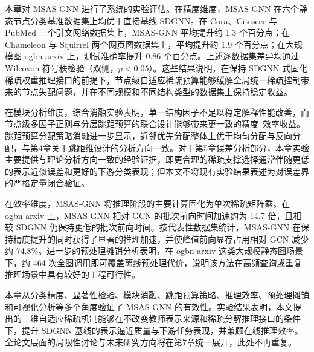 本章对 MSAS-GNN 进行了系统的实验评估。在精度维度，MSAS-GNN 在六个静态节点分类基准数据集上均优于直接基线 SDGNN。在 Cora、Citeseer 与 PubMed 三个引文网络数据集上，MSAS-GNN 平均提升约 1.3 个百分点；在 Chameleon 与 Squirrel 两个网页图数据集上，平均提升约 1.9 个百分点；在大规模图 ogbn-arxiv 上，测试准确率提升 0.86 个百分点。上述逐数据集差异均通过 Wilcoxon 符号秩检验（双侧，$p<0.05$）。这些结果说明，在保持 SDGNN 式固化稀疏权重推理接口的前提下，节点级自适应稀疏预算能够缓解全局统一稀疏控制带来的节点失配问题，并在不同规模和不同结构类型的数据集上保持稳定收益。

在模块分析维度，综合消融实验表明，单一结构因子不足以稳定解释性能改善，而节点级多因子正则与分层跳距预算的联合设计能够带来更一致的精度--效率收益。跳距预算分配策略消融进一步显示，近邻优先分配整体上优于均匀分配与反向分配，与第4章关于跳距维设计的分析方向一致。对于第5章误差分析部分，本章实验主要提供与理论分析方向一致的经验证据，即更合理的稀疏支撑选择通常伴随更低的表示近似误差和更好的下游分类表现；但本文不将现有实验结果表述为对误差界的严格定量闭合验证。

在效率维度，MSAS-GNN 将推理阶段的主要计算固化为单次稀疏矩阵乘。在 ogbn-arxiv 上，MSAS-GNN 相对 GCN 的批次前向时间加速约为 14.7 倍，且相较 SDGNN 仍保持更低的批次前向时间。按代表性数据集统计，MSAS-GNN 在保持精度提升的同时获得了显著的推理加速，并使峰值前向显存占用相对 GCN 减少约 74.8\%。进一步的预处理摊销分析表明，在 ogbn-arxiv 这类大规模静态图场景下，约 464 次全图调用即可覆盖离线预处理代价，说明该方法在高频查询或重复推理场景中具有较好的工程可行性。

本章从分类精度、显著性检验、模块消融、跳距预算策略、推理效率、预处理摊销和可视化分析等多个角度验证了 MSAS-GNN 的有效性。实验结果表明，本文提出的三维自适应稀疏机制能够在不改变教师表示来源和稀疏分解推理接口的条件下，提升 SDGNN 基线的表示逼近质量与下游任务表现，并兼顾在线推理效率。全论文层面的局限性讨论与未来研究方向将在第7章统一展开，此处不再重复。